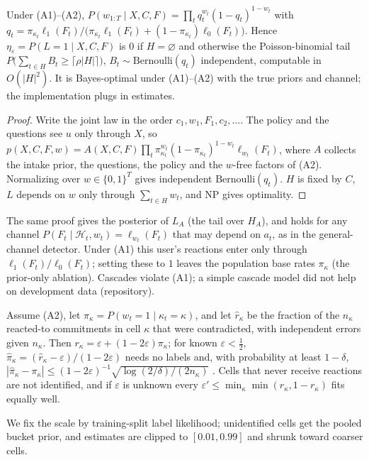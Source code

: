 \begin{proposition}
\label{prop:posterior}
Under (A1)--(A2), $P(w_{1:T}\mid X,C,F)=\prod_t q_t^{w_t}(1-q_t)^{1-w_t}$ with
$q_t=\pi_{\kappa_t}\ell_1(F_t)/\big(\pi_{\kappa_t}\ell_1(F_t)+(1-\pi_{\kappa_t})\ell_0(F_t)\big)$.
Hence $\eta_\varepsilon=P(L=1\mid X,C,F)$ is $0$ if $H=\varnothing$ and
otherwise the Poisson-binomial tail
$P\big(\sum_{t\in H}B_t\ge\lceil\rho|H|\rceil\big)$,
$B_t\sim\mathrm{Bernoulli}(q_t)$ independent, computable in $O(|H|^2)$. It is
Bayes-optimal under (A1)--(A2) with the true priors and channel; the
implementation plugs in estimates.
\end{proposition}
\begin{proof}
Write the joint law in the order $c_1,w_1,F_1,c_2,\dots$. The policy and the
questions see $u$ only through $X$, so
$p(X,C,F,w)=A(X,C,F)\prod_t\pi_{\kappa_t}^{w_t}(1-\pi_{\kappa_t})^{1-w_t}\ell_{w_t}(F_t)$,
where $A$ collects the intake prior, the questions, the policy and the
$w$-free factors of (A2). Normalizing over $w\in\{0,1\}^T$ gives independent
$\mathrm{Bernoulli}(q_t)$. $H$ is fixed by $C$, $L$ depends on $w$ only
through $\sum_{t\in H}w_t$, and NP gives optimality.
\end{proof}

\noindent The same proof gives the posterior of $L_A$ (the tail over $H_A$),
and holds for any channel $P(F_t\mid\mathcal{H}_t,w_t)=\ell_{w_t}(F_t)$
that may depend on $a_t$, as in the general-channel detector. Under (A1) this
user's reactions enter only through $\ell_1(F_t)/\ell_0(F_t)$; setting these to $1$ leaves the population
base rates $\pi_\kappa$ (the prior-only ablation). Cascades violate (A1); a simple
cascade model did not help on development data (repository).

\begin{proposition}
\label{prop:identify}
Assume (A2), let $\pi_\kappa=P(w_t=1\mid\kappa_t=\kappa)$, and let
$\hat r_\kappa$ be the fraction of the $n_\kappa$ reacted-to commitments in
cell $\kappa$ that were contradicted, with independent errors given
$n_\kappa$. Then $r_\kappa=\varepsilon+(1-2\varepsilon)\pi_\kappa$; for
known $\varepsilon<\tfrac12$, $\hat\pi_\kappa=(\hat r_\kappa-\varepsilon)/(1-2\varepsilon)$
needs no labels and, with probability at least $1-\delta$,
$|\hat\pi_\kappa-\pi_\kappa|\le(1-2\varepsilon)^{-1}\sqrt{\log(2/\delta)/(2n_\kappa)}$
\citep{hoeffding1963probability}. Cells that never receive reactions are not
identified, and if $\varepsilon$ is unknown every
$\varepsilon'\le\min_\kappa\min(r_\kappa,1-r_\kappa)$ fits equally well.
\end{proposition}

\noindent We fix the scale by training-split label likelihood; unidentified
cells get the pooled bucket prior, and estimates are clipped to
$[0.01,0.99]$ and shrunk toward coarser cells.
